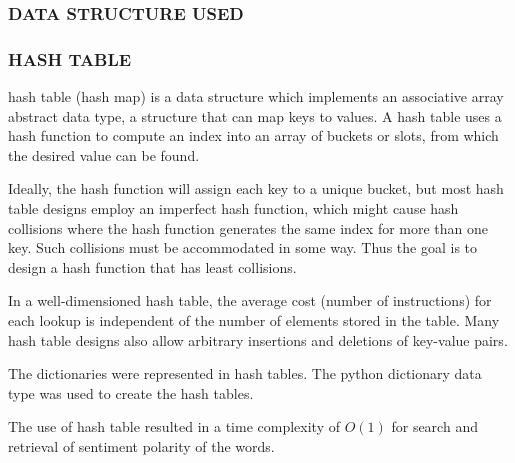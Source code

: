 \subsubsection{DATA STRUCTURE USED}
\subsubsection{HASH TABLE}
hash table (hash map) is a data structure which implements an associative array abstract data type, a structure that can map keys to values. A hash table uses a hash function to compute an index into an array of buckets or slots, from which the desired value can be found.

Ideally, the hash function will assign each key to a unique bucket, but most hash table designs employ an imperfect hash function, which might cause hash collisions where the hash function generates the same index for more than one key. Such collisions must be accommodated in some way. Thus the goal is to design a hash function that has least collisions.

In a well-dimensioned hash table, the average cost (number of instructions) for each lookup is independent of the number of elements stored in the table. Many hash table designs also allow arbitrary insertions and deletions of key-value pairs.

The dictionaries were represented in hash tables. The python dictionary data type was used to create the hash tables.

The use of hash table resulted in a time complexity of $ O(1) $ for search and retrieval of  sentiment polarity of the words.

